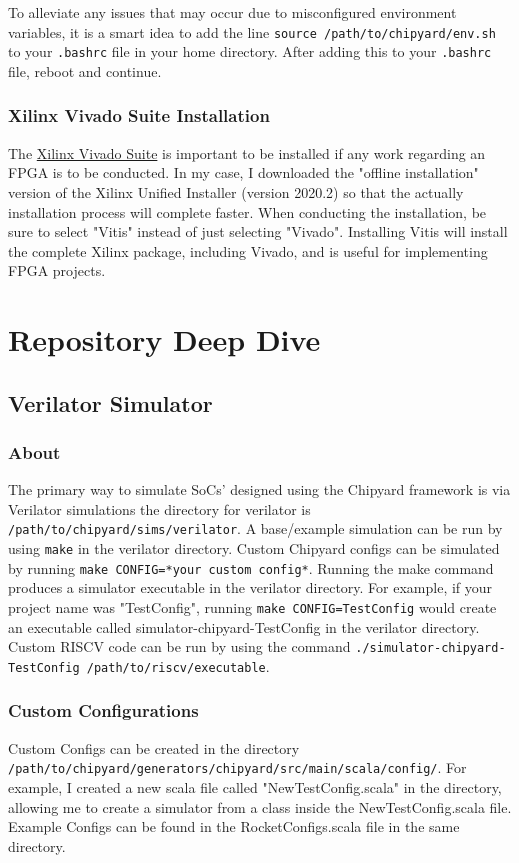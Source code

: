 \documentclass{article}
\begin{document}
	To alleviate any issues that may occur due to misconfigured environment variables, it is a smart idea to add the line \texttt{source /path/to/chipyard/env.sh} to your \texttt{.bashrc} file in your home directory. After adding this to your \texttt{.bashrc} file, reboot and continue.
	
	\subsubsection{Xilinx Vivado Suite Installation}
	The \hyperref{https://www.xilinx.com/support/download.html}{}{}{Xilinx Vivado Suite} is important to be installed if any work regarding an FPGA is to be conducted. In my case, I downloaded the "offline installation" version of the Xilinx Unified Installer (version 2020.2) so that the actually installation process will complete faster. When conducting the installation, be sure to select "Vitis" instead of just selecting "Vivado". Installing Vitis will install the complete Xilinx package, including Vivado, and is useful for implementing FPGA projects.
	
	
	\section{Repository Deep Dive}
	\subsection{Verilator Simulator}
	\subsubsection{About}
	The primary way to simulate SoCs' designed using the Chipyard framework is via Verilator simulations the directory for verilator is \texttt{/path/to/chipyard/sims/verilator}. A base/example simulation can be run by using \texttt{make} in the verilator directory. Custom Chipyard configs can be simulated by running \texttt{make CONFIG=*your custom config*}. Running the make command produces a simulator executable in the verilator directory. For example, if your project name was "TestConfig", running \texttt{make CONFIG=TestConfig} would create an executable called simulator-chipyard-TestConfig in the verilator directory. Custom RISCV code can be run by using the command \texttt{./simulator-chipyard-TestConfig /path/to/riscv/executable}. 
	\subsubsection{Custom Configurations}Custom Configs can be created in the directory \texttt{/path/to/chipyard/generators/chipyard/src/main/scala/config/}. For example, I created a new scala file called "NewTestConfig.scala" in the directory, allowing me to create a simulator from a class inside the NewTestConfig.scala file. Example Configs can be found in the RocketConfigs.scala file in the same directory.
	
\end{document}
